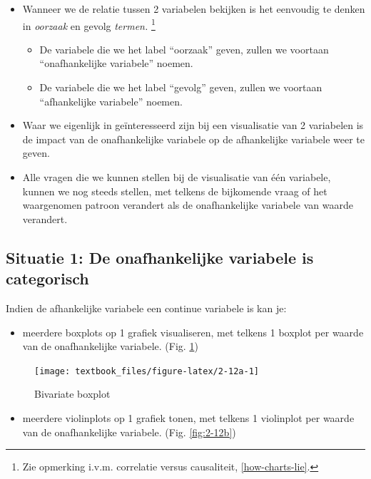 \documentclass[]{tufte-book}
\providecommand{\tightlist}{%
  \setlength{\itemsep}{0pt}\setlength{\parskip}{0pt}}
\begin{document}
\begin{itemize}
\tightlist
\item
  Wanneer we de relatie tussen 2 variabelen bekijken is het eenvoudig te denken in \emph{oorzaak} en gevolg \emph{termen.} \footnote{Zie opmerking i.v.m. correlatie versus causaliteit, \ref{how-charts-lie}.}

  \begin{itemize}
  \tightlist
  \item
    De variabele die we het label ``oorzaak'' geven, zullen we voortaan ``onafhankelijke variabele'' noemen.
  \item
    De variabele die we het label ``gevolg'' geven, zullen we voortaan ``afhankelijke variabele'' noemen.
  \end{itemize}
\item
  Waar we eigenlijk in geïnteresseerd zijn bij een visualisatie van 2 variabelen is de impact van de onafhankelijke variabele op de afhankelijke variabele weer te geven.
\item
  Alle vragen die we kunnen stellen bij de visualisatie van één variabele, kunnen we nog steeds stellen, met telkens de bijkomende vraag of het waargenomen patroon verandert als de onafhankelijke variabele van waarde verandert.
\end{itemize}

\hypertarget{situatie-1-de-onafhankelijke-variabele-is-categorisch}{%
\subsection{Situatie 1: De onafhankelijke variabele is categorisch}\label{situatie-1-de-onafhankelijke-variabele-is-categorisch}}

Indien de afhankelijke variabele een continue variabele is kan je:

\begin{itemize}
\tightlist
\item
  meerdere boxplots op 1 grafiek visualiseren, met telkens 1 boxplot per waarde van de onafhankelijke variabele. (Fig. \ref{fig:2-12a})
\end{itemize}

\begin{figure}
\texttt{[image: textbook\_files/figure-latex/2-12a-1]} \caption[Bivariate boxplot]{Bivariate boxplot}\label{fig:2-12a}
\end{figure}

\begin{itemize}
\tightlist
\item
  meerdere violinplots op 1 grafiek tonen, met telkens 1 violinplot per waarde van de onafhankelijke variabele. (Fig. \ref{fig:2-12b})
\end{itemize}
\end{document}
